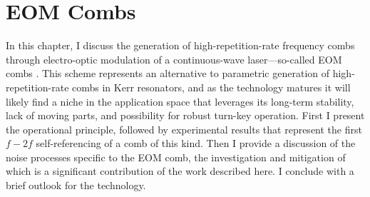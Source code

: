  \chapter{EOM Combs}\label{chap:EOMCombs}

In this chapter, I discuss the generation of high-repetition-rate frequency combs through electro-optic modulation of a continuous-wave laser---so-called EOM combs \cite{Kobayashi1972,Kourogi1993,Murata2000,Sakamoto2007,Morohashi2008,Ishizawa2010,Wu2010,Supradeepa2012,Metcalf2013,Wu2013}. This scheme represents an alternative to parametric generation of high-repetition-rate combs in Kerr resonators, and as the technology matures it will likely find a niche in the application space that leverages its long-term stability, lack of moving parts, and possibility for robust turn-key operation. First I present the operational principle, followed by experimental results that represent the first $f-2f$ self-referencing of a comb of this kind. Then I provide a discussion of the noise processes specific to the EOM comb, the investigation and mitigation of which is a significant contribution of the work described here. I conclude with a brief outlook for the technology.

